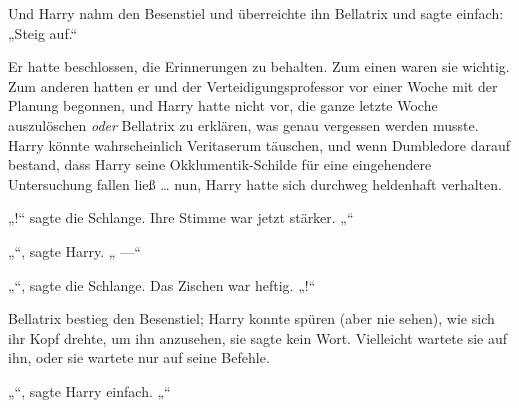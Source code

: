 Und Harry nahm den Besenstiel und überreichte ihn Bellatrix und sagte einfach:
„Steig auf.“

Er hatte beschlossen, die Erinnerungen zu behalten. Zum einen waren sie wichtig. Zum anderen hatten er und der Verteidigungsprofessor vor einer Woche mit der Planung begonnen, und Harry hatte nicht vor, die ganze letzte Woche auszulöschen \emph{oder} Bellatrix zu erklären, was genau vergessen werden musste. Harry könnte wahrscheinlich Veritaserum täuschen, und wenn Dumbledore darauf bestand, dass Harry seine Okklumentik-Schilde für eine eingehendere Untersuchung fallen ließ … nun, Harry hatte sich durchweg heldenhaft verhalten.

„!“ sagte die Schlange. Ihre Stimme war jetzt stärker. „“

„“, sagte Harry. „ —“

„“, sagte die Schlange. Das Zischen war heftig. „!“

Bellatrix bestieg den Besenstiel; Harry konnte spüren (aber nie sehen), wie sich ihr Kopf drehte, um ihn anzusehen, sie sagte kein Wort. Vielleicht wartete sie auf ihn, oder sie wartete nur auf seine Befehle.

„“, sagte Harry einfach. „“

